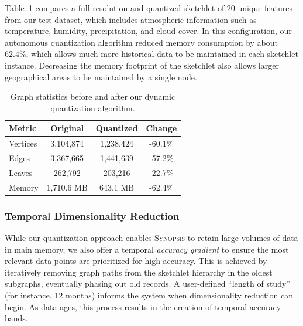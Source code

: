 Table~\ref{tbl:graph-stats} compares a full-resolution and quantized sketchlet of 20 unique features from our test dataset, which includes atmospheric information such as temperature, humidity, precipitation, and cloud cover. In this configuration, our autonomous quantization algorithm reduced memory consumption by about 62.4\%, which allows much more historical data to be maintained in each sketchlet instance. Decreasing the memory footprint of the sketchlet also allows larger geographical areas to be maintained by a single node.

\begin{table}[h!]
    \renewcommand{\arraystretch}{1.3}
    \caption{Graph statistics before and after our dynamic quantization algorithm.}
    \label{tbl:graph-stats}
    \begin{center}
        \begin{tabular}{|l|c|c|c|}
            \hline
            \textbf{Metric} & \textbf{Original} & \textbf{Quantized} & \textbf{Change} \\
            \hline
            Vertices & 3,104,874 & 1,238,424 & -60.1\% \\
            \hline
            Edges    & 3,367,665 & 1,441,639 & -57.2\% \\
            \hline
            Leaves   & 262,792   & 203,216   & -22.7\% \\
            \hline
            Memory   & 1,710.6 MB & 643.1 MB  & -62.4\% \\
            \hline
        \end{tabular}
    \end{center}
\end{table}

\subsubsection{Temporal Dimensionality Reduction}
While our quantization approach enables \textsc{Synopsis} to retain large volumes of data in main memory, we also offer a temporal \emph{accuracy gradient} to ensure the most relevant data points are prioritized for high accuracy. This is achieved by iteratively removing graph paths from the sketchlet hierarchy in the oldest subgraphs, eventually phasing out old records. A user-defined ``length of study'' (for instance, 12 months) informs the system when dimensionality reduction can begin. As data ages, this process results in the creation of temporal accuracy bands.

